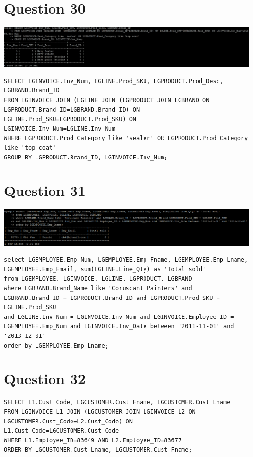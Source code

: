 \documentclass[a4paper,10pt]{article}
\begin{document}
\section*{Question 30}
\includegraphics{Queries/Question_30/Q30_screenshot.jpg}
\lstset{
            language=SQL,
            breaklines=true
            }
        \begin{lstlisting}[frame=single]
        SELECT LGINVOICE.Inv_Num, LGLINE.Prod_SKU, LGPRODUCT.Prod_Desc, LGBRAND.Brand_ID
FROM LGINVOICE JOIN (LGLINE JOIN (LGPRODUCT JOIN LGBRAND ON LGPRODUCT.Brand_ID=LGBRAND.Brand_ID) ON LGLINE.Prod_SKU=LGPRODUCT.Prod_SKU) ON LGINVOICE.Inv_Num=LGLINE.Inv_Num
WHERE LGPRODUCT.Prod_Category like 'sealer' OR LGPRODUCT.Prod_Category like 'top coat'
GROUP BY LGPRODUCT.Brand_ID, LGINVOICE.Inv_Num;
        \end{lstlisting}
\section*{Question 31}
\includegraphics{Queries/Question_31/Question_31_screenshot.PNG}
\lstset{
            language=SQL,
            breaklines=true
            }
        \begin{lstlisting}[frame=single]
        select LGEMPLOYEE.Emp_Num, LGEMPLOYEE.Emp_Fname, LGEMPLOYEE.Emp_Lname, LGEMPLOYEE.Emp_Email, sum(LGLINE.Line_Qty) as 'Total sold' 
from LGEMPLOYEE, LGINVOICE, LGLINE, LGPRODUCT, LGBRAND 
where LGBRAND.Brand_Name like 'Coruscant Painters' and LGBRAND.Brand_ID = LGPRODUCT.Brand_ID and LGPRODUCT.Prod_SKU = LGLINE.Prod_SKU 
and LGLINE.Inv_Num = LGINVOICE.Inv_Num and LGINVOICE.Employee_ID = LGEMPLOYEE.Emp_Num and LGINVOICE.Inv_Date between '2011-11-01' and '2013-12-01' 
order by LGEMPLOYEE.Emp_Lname;
        \end{lstlisting}
\section*{Question 32}
\lstset{
            language=SQL,
            breaklines=true
            }
        \begin{lstlisting}[frame=single]
        SELECT L1.Cust_Code, LGCUSTOMER.Cust_Fname, LGCUSTOMER.Cust_Lname
FROM LGINVOICE L1 JOIN (LGCUSTOMER JOIN LGINVOICE L2 ON LGCUSTOMER.Cust_Code=L2.Cust_Code) ON L1.Cust_Code=LGCUSTOMER.Cust_Code
WHERE L1.Employee_ID=83649 AND L2.Employee_ID=83677
ORDER BY LGCUSTOMER.Cust_Lname, LGCUSTOMER.Cust_Fname;

        \end{lstlisting}
\end{document}
